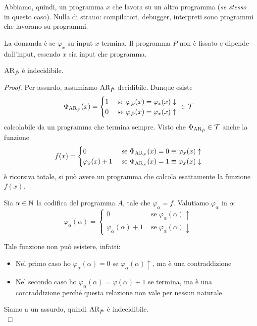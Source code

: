 Abbiamo, quindi, un programma $x$ che lavora su un altro programma (\textit{se stesso} in questo caso). Nulla di strano: compilatori, debugger, interpreti sono programmi che lavorano su programmi.

La domanda è se $\varphi_x$ su input $x$ termina. Il programma $P$ non è fissato e dipende dall'input, essendo $x$ sia input che programma.\\

\begin{theor}
	$\text{AR}_{\hat{P}}$ è indecidibile.
\end{theor}
\begin{proof}
	Per assurdo, assumiamo $\text{AR}_{\hat{P}}$ decidibile. Dunque esiste
	$$
	\Phi_{\text{AR}_{\hat{P}}} (x) = \begin{cases}
		1 & \text{ se } \varphi_{\hat{P}} (x) = \varphi_x (x) \downarrow \\
		0 & \text{ se } \varphi_{\hat{P}} (x) = \varphi_x (x) \uparrow \\
	\end{cases}
	\ \in \mathcal{T}
	$$
	calcolabile da un programma che termina sempre. Visto che $\Phi_{\text{AR}_{\hat{P}}} \in \mathcal{T}$ anche la funzione
	$$
	f(x) = \begin{cases}
		0 & \text{ se } \Phi_{\text{AR}_{\hat{P}}} (x) = 0 \equiv \varphi_x (x) \uparrow \\
		\varphi_x (x) + 1 & \text{ se } \Phi_{\text{AR}_{\hat{P}}} (x) = 1 \equiv \varphi_x (x) \downarrow
	\end{cases}
	$$
	è ricorsiva totale, si può avere un programma che calcola esattamente la funzione $f(x)$.

	Sia $\alpha \in \mathbb{N}$ la codifica del programma $A$, tale che $\varphi_\alpha = f$.  Valutiamo $\varphi_\alpha$ in $\alpha$:
	$$
	\varphi_\alpha (\alpha) = \begin{cases}
		0 & \text{ se } \varphi_\alpha (\alpha) \uparrow \\
		\varphi_\alpha (\alpha) + 1 & \text{ se } \varphi_\alpha(\alpha) \downarrow
	\end{cases}
	$$

	Tale funzione non può esistere, infatti:
	\begin{itemize}
		\item Nel primo caso ho $\varphi_\alpha (\alpha) = 0$ se $\varphi_\alpha(\alpha) \uparrow$, ma è una contraddizione
		
        \item Nel secondo caso ho $\varphi_\alpha (\alpha) = \varphi(\alpha) + 1$ se termina, ma è una contraddizione perché questa relazione non vale per nessun naturale
	\end{itemize}

	Siamo a un assurdo, quindi $\text{AR}_{\hat{P}}$ è indecidibile. \\
\end{proof}

